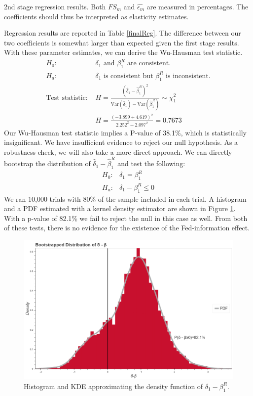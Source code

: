 \documentclass[a4paper,man,floatsintext,natbib]{apa6}
\begin{document}
	\begin{table}[!htbp] \centering
		
	\caption{2nd stage regression results. Both \(FS_m\) and \(\hat{\epsilon_m}\) are measured in percentages. The coefficients should thus be interpreted as elasticity estimates.}
	\label{finalReg}
	\end{table}

	Regression results are reported in Table \ref{finalReg}. The difference between our two coefficients is somewhat larger than expected given the first stage results. With these parameter estimates, we can derive the Wu-Hausman test statistic.
	\begin{align*}
		H_0: &\delta_1 \text{ and } \beta_1^R \text{ are consistent.} \\
		H_a: &\delta_1 \text{ is consistent but } \beta_1^R \text{ is inconsistent.} \\
		\text{Test statistic: } &H = \frac{(\hat{\delta}_1-\hat{\beta}_1^R)^2}{\mathrm{Var}(\hat{\delta}_1)-\mathrm{Var}(\hat{\beta}_1^R)} \sim \chi^2_1 \\
		&H = \frac{(-3.899+4.619)^2}{2.252^2 - 2.097^2} = 0.7673
	\end{align*}
	Our Wu-Hausman test statistic implies a P-value of 38.1\%, which is statistically insignificant. We have insufficient evidence to reject our null hypothesis. As a robustness check, we will also take a more direct approach. We can directly bootstrap the distribution of \(\hat{\delta}_1-\hat{\beta}_1^R\) and test the following:
	\begin{align*}
		H_0: &\delta_1 = \beta_1^R \\
		H_a: &\delta_1 - \beta_1^R\leq0 
	\end{align*}
	We ran 10,000 trials with 80\% of the sample included in each trial. A histogram and a PDF estimated with a kernel density estimator are shown in Figure \ref{bootstrap}. With a p-value of 82.1\% we fail to reject the null in this case as well. From both of these tests, there is no evidence for the existence of the Fed-information effect. 
	 
	\begin{figure}
		\centering
		\includegraphics[width=\textwidth]{charts/bootstrap_ns_95sample.png}
		\caption{\label{bootstrap} Histogram and KDE approximating the density function of \(\delta_1 - \beta_1^R\).}
	\end{figure}
\end{document}
